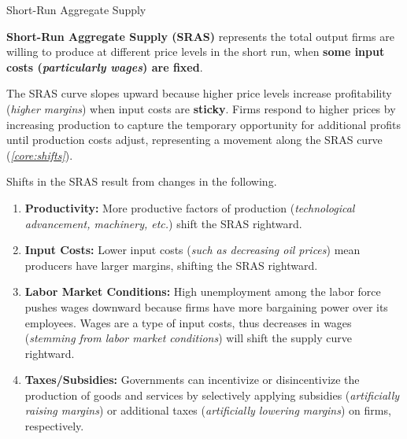 \documentclass[10pt]{article}
\begin{document}
    \begin{core}{Short-Run Aggregate Supply}

      \textbf{Short-Run Aggregate Supply (SRAS)} represents the total output firms are willing to produce at different price levels in the short run, when \textbf{some input costs (\textit{particularly wages}) are fixed}.


      The SRAS curve slopes upward because higher price levels increase profitability (\textit{higher margins}) when input costs are \textbf{sticky}. Firms respond to higher prices by increasing production to capture the temporary opportunity for additional profits until production costs adjust, representing a movement along the SRAS curve (\textit{\autoref{core:shifts}}).

      Shifts in the SRAS result from changes in the following.

      \begin{enumerate}

        \item \textbf{Productivity:} More productive factors of production (\textit{technological advancement, machinery, etc.}) shift the SRAS rightward.

        \item \textbf{Input Costs:} Lower input costs (\textit{such as decreasing oil prices}) mean producers have larger margins, shifting the SRAS rightward.

        \item \textbf{Labor Market Conditions:} High unemployment among the labor force pushes wages downward because firms have more bargaining power over its employees. Wages are a type of input costs, thus decreases in wages (\textit{stemming from labor market conditions}) will shift the supply curve rightward.

        \item \textbf{Taxes/Subsidies:} Governments can incentivize or disincentivize the production of goods and services by selectively applying subsidies (\textit{artificially raising margins}) or additional taxes (\textit{artificially lowering margins}) on firms, respectively.

      \end{enumerate}

    \end{core}
\end{document}
